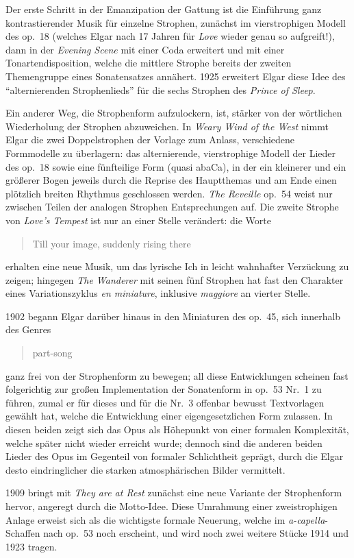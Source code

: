 \documentclass[a4paper,11pt,open=any]{scrbook}
\newcommand{\engquote}[1]{\foreignblockquote{english}{#1}}
\begin{document}
Der erste Schritt in der Emanzipation der Gattung ist die Einführung ganz
kontrastierender Musik für einzelne Strophen, zunächst im vierstrophigen
Modell des op.~18 (welches Elgar nach 17 Jahren für \textit{Love} wieder
genau so aufgreift!), dann in der \textit{Evening Scene} mit einer Coda
erweitert und mit einer Tonartendisposition, welche die mittlere Strophe
bereits der zweiten Themengruppe eines Sonatensatzes annähert.  1925
erweitert Elgar diese Idee des \enquote{alternierenden Strophenlieds} für
die sechs Strophen des \textit{Prince of Sleep}.

Ein anderer Weg, die Strophenform aufzulockern, ist, stärker von der
wörtlichen Wiederholung der Strophen abzuweichen.  In \textit{Weary Wind
of the West} nimmt Elgar die zwei Doppelstrophen der Vorlage zum Anlass,
verschiedene Formmodelle zu überlagern: das alternierende, vierstrophige
Modell der Lieder des op.~18 sowie eine fünfteilige Form (quasi \textsf{abaCa}),
in der ein kleinerer und ein größerer Bogen jeweils durch die Reprise des
Hauptthemas und am Ende einen plötzlich breiten Rhythmus geschlossen werden.
\textit{The Reveille} op.~54 weist nur zwischen Teilen der analogen Strophen
Entsprechungen auf.  Die zweite Strophe von \textit{Love’s Tempest} ist nur
an einer Stelle verändert: die Worte \engquote{Till your image, suddenly
rising there} erhalten eine neue Musik, um das lyrische Ich in leicht
wahnhafter Verzückung zu zeigen; hingegen \textit{The Wanderer} mit seinen
fünf Strophen hat fast den Charakter eines Variationszyklus \textit{en
miniature}, inklusive \textit{maggiore} an vierter Stelle.

1902 begann Elgar darüber hinaus in den Miniaturen des op.~45, sich innerhalb
des Genres \engquote{part-song} ganz frei von der Strophenform zu bewegen;
all diese Entwicklungen scheinen fast folgerichtig zur großen Implementation
der Sonatenform in op.~53 Nr.~1 zu führen, zumal er für dieses und für die
Nr.~3 offenbar bewusst Textvorlagen gewählt hat, welche die Entwicklung
einer eigengesetzlichen Form zulassen.  In diesen beiden zeigt sich das Opus
als Höhepunkt von einer formalen Komplexität, welche später nicht wieder
erreicht wurde;  dennoch sind die anderen beiden Lieder des Opus im Gegenteil
von formaler Schlichtheit geprägt, durch die Elgar desto eindringlicher die
starken atmosphärischen Bilder vermittelt.

1909 bringt mit \textit{They are at Rest} zunächst eine neue Variante der
Strophenform hervor, angeregt durch die Motto-Idee.  Diese Umrahmung einer
zweistrophigen Anlage erweist sich als die wichtigste formale Neuerung,
welche im \textit{a-capella}-Schaffen nach op.~53 noch erscheint, und wird
noch zwei weitere Stücke 1914 und 1923 tragen.
\end{document}

